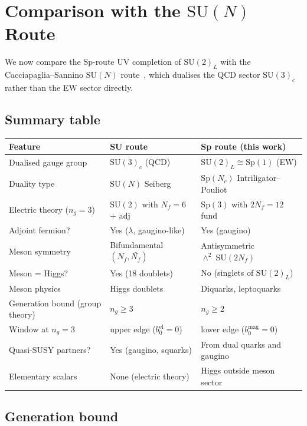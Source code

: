 \documentclass[11pt,a4paper]{article}
\theoremstyle{plain}
\theoremstyle{definition}
\theoremstyle{remark}
\newcommand{\Nc}{N_{\!c}}
\newcommand{\Nf}{N_{\!f}}
\newcommand{\SU}[1]{\mathrm{SU}(#1)}
\newcommand{\Sp}[1]{\mathrm{Sp}(#1)}
\newcommand{\antisym}{\wedge^{\!2}}
\begin{document}
\section{Comparison with the $\SU{N}$ Route}
\label{sec:comparison}

We now compare the Sp-route UV completion of $\SU{2}_L$ with the
Cacciapaglia--Sannino $\SU{N}$ route~\cite{CacciapagliaSannino2024},
which dualises the QCD sector $\SU{3}_c$ rather than the EW sector
directly.

\subsection{Summary table}

\begin{center}
\small
\renewcommand{\arraystretch}{1.5}
\begin{tabular}{l l l}
\toprule
\textbf{Feature} & \textbf{SU route}~\cite{CacciapagliaSannino2024}
  & \textbf{Sp route (this work)} \\
\midrule
Dualised gauge group & $\SU{3}_c$ (QCD) & $\SU{2}_L \cong \Sp{1}$ (EW) \\
Duality type & $\SU{N}$ Seiberg & $\Sp{\Nc}$ Intriligator--Pouliot \\
Electric theory ($n_g = 3$) & $\SU{2}$ with $\Nf = 6$ + adj
  & $\Sp{3}$ with $2\Nf = 12$ fund \\
Adjoint fermion? & Yes ($\lambda$, gaugino-like) & Yes (gaugino) \\
Meson symmetry & Bifundamental $(\Nf, \bar{\Nf})$
  & Antisymmetric $\antisym\;\SU{2\Nf}$ \\
Meson = Higgs? & Yes (18 doublets) & No (singlets of $\SU{2}_L$) \\
Meson physics & Higgs doublets & Diquarks, leptoquarks \\
Generation bound (group theory) & $n_g \geq 3$ & $n_g \geq 2$ \\
Window at $n_g = 3$ & upper edge ($b_0^{\mathrm{el}} = 0$)
  & lower edge ($b_0^{\mathrm{mag}} = 0$) \\
Quasi-SUSY partners? & Yes (gaugino, squarks)
  & From dual quarks and gaugino \\
Elementary scalars & None (electric theory)
  & Higgs outside meson sector \\
\bottomrule
\end{tabular}
\end{center}

\subsection{Generation bound}
\end{document}
